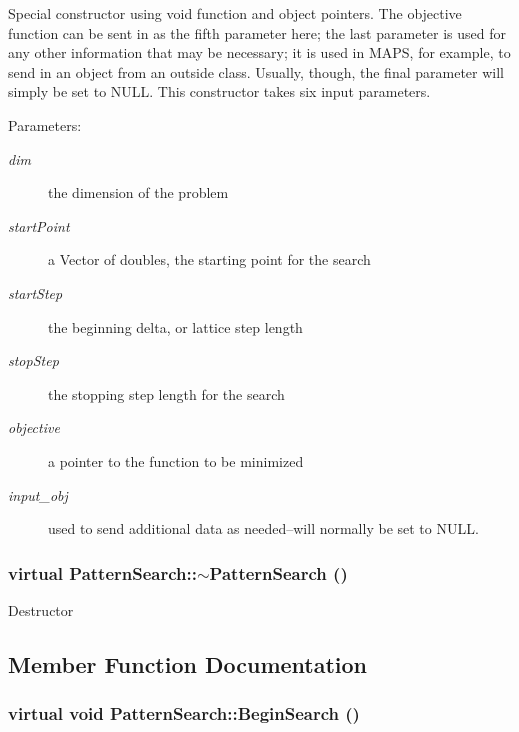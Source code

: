 Special constructor using void function and object pointers. The objective function can be sent in as the fifth parameter here; the last parameter is used for any other information that may be necessary; it is used in MAPS, for example, to send in an object from an outside class. Usually, though, the final parameter will simply be set to NULL. This constructor takes six input parameters. \begin{Desc}
\item[Parameters:]
\begin{description}
\item[{\em dim}]the dimension of the problem \item[{\em start\-Point}]a Vector of doubles, the starting point for the search \item[{\em start\-Step}]the beginning delta, or lattice step length \item[{\em stop\-Step}]the stopping step length for the search \item[{\em objective}]a pointer to the function to be minimized \item[{\em input\_\-obj}]used to send additional data as needed--will normally be set to NULL. \end{description}
\end{Desc}
\subsubsection{\setlength{\rightskip}{0pt plus 5cm}virtual Pattern\-Search::$\sim${\bf Pattern\-Search} ()\hspace{0.3cm}{\tt  [virtual]}}\label{classPatternSearch_z15_3}


Destructor 

\subsection{Member Function Documentation}
\subsubsection{\setlength{\rightskip}{0pt plus 5cm}virtual void Pattern\-Search::Begin\-Search ()\hspace{0.3cm}{\tt  [pure virtual]}}\label{classPatternSearch_z19_0}


